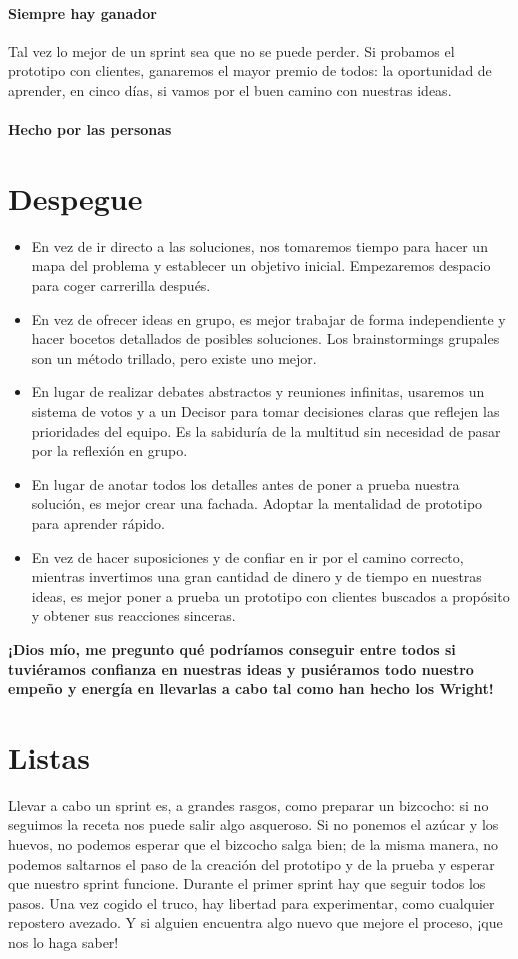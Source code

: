 \documentclass[10pt]{article}
\begin{document}
\begin{multicols}{2}
\subsection*{Siempre hay ganador}
Tal vez lo mejor de un sprint sea que no se puede perder. Si probamos el prototipo con clientes, ganaremos el mayor premio de todos: la oportunidad de aprender, en cinco días, si vamos por el buen camino con nuestras ideas. 
\subsection*{Hecho por las personas}
\end{multicols}
\part*{\center Despegue}
\begin{multicols}{2}
\begin{itemize}
\item En vez de ir directo a las soluciones, nos tomaremos tiempo para hacer un mapa del problema y establecer un objetivo inicial. Empezaremos despacio para coger carrerilla después.
\item En vez de ofrecer ideas en grupo, es mejor trabajar de forma independiente y hacer bocetos detallados de posibles soluciones. Los brainstormings grupales son un método trillado, pero existe uno mejor.
\item En lugar de realizar debates abstractos y reuniones infinitas, usaremos un sistema de votos y a un Decisor para tomar decisiones claras que reflejen las prioridades del equipo. Es la sabiduría de la multitud sin necesidad de pasar por la reflexión en grupo.
\item En lugar de anotar todos los detalles antes de poner a prueba nuestra solución, es mejor crear una fachada. Adoptar la mentalidad de prototipo para aprender rápido.
\item En vez de hacer suposiciones y de confiar en ir por el camino correcto, mientras invertimos una gran cantidad de dinero y de tiempo en nuestras ideas, es mejor poner a prueba un prototipo con clientes buscados a propósito y obtener sus reacciones sinceras.
\end{itemize}
\textbf{¡Dios mío, me pregunto qué podríamos
conseguir entre todos si tuviéramos confianza en nuestras ideas y pusiéramos todo nuestro empeño y energía en llevarlas a cabo tal como han hecho los Wright!}

\part*{\center Listas}
Llevar a cabo un sprint es, a grandes rasgos, como preparar un bizcocho: si no seguimos la receta nos puede salir algo asqueroso. Si no ponemos el azúcar y los huevos, no podemos esperar que el bizcocho salga bien; de la misma manera, no podemos saltarnos el paso de la creación del prototipo y de la prueba y esperar que nuestro sprint funcione. Durante el primer sprint hay que seguir todos los pasos. Una vez cogido el truco, hay libertad para experimentar, como cualquier repostero avezado. Y si alguien encuentra algo nuevo que mejore el proceso, ¡que nos lo haga saber!

\end{multicols}
\end{document}
